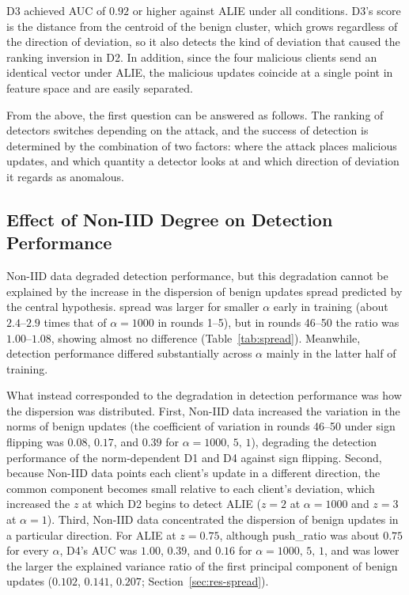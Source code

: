 \documentclass[a4paper,10pt]{article}
\newcommand{\PushRatio}{\textrm{push\_ratio}}
\newcommand{\Spread}{\textrm{spread}}
\begin{document}
D3 achieved AUC of $0.92$ or higher against ALIE under all conditions. D3's score is the distance from the centroid of the benign cluster, which grows regardless of the direction of deviation, so it also detects the kind of deviation that caused the ranking inversion in D2. In addition, since the four malicious clients send an identical vector under ALIE, the malicious updates coincide at a single point in feature space and are easily separated.

From the above, the first question can be answered as follows. The ranking of detectors switches depending on the attack, and the success of detection is determined by the combination of two factors: where the attack places malicious updates, and which quantity a detector looks at and which direction of deviation it regards as anomalous.

\subsection{Effect of Non-IID Degree on Detection Performance}
\label{sec:disc-noniid}

Non-IID data degraded detection performance, but this degradation cannot be explained by the increase in the dispersion of benign updates \Spread{} predicted by the central hypothesis. \Spread{} was larger for smaller $\alpha$ early in training (about $2.4$--$2.9$ times that of $\alpha=1000$ in rounds 1--5), but in rounds 46--50 the ratio was $1.00$--$1.08$, showing almost no difference (Table~\ref{tab:spread}). Meanwhile, detection performance differed substantially across $\alpha$ mainly in the latter half of training.

What instead corresponded to the degradation in detection performance was how the dispersion was distributed. First, Non-IID data increased the variation in the norms of benign updates (the coefficient of variation in rounds 46--50 under sign flipping was $0.08$, $0.17$, and $0.39$ for $\alpha=1000,\,5,\,1$), degrading the detection performance of the norm-dependent D1 and D4 against sign flipping. Second, because Non-IID data points each client's update in a different direction, the common component becomes small relative to each client's deviation, which increased the $z$ at which D2 begins to detect ALIE ($z=2$ at $\alpha=1000$ and $z=3$ at $\alpha=1$). Third, Non-IID data concentrated the dispersion of benign updates in a particular direction. For ALIE at $z=0.75$, although \PushRatio{} was about $0.75$ for every $\alpha$, D4's AUC was $1.00$, $0.39$, and $0.16$ for $\alpha=1000,\,5,\,1$, and was lower the larger the explained variance ratio of the first principal component of benign updates ($0.102$, $0.141$, $0.207$; Section~\ref{sec:res-spread}).
\end{document}
